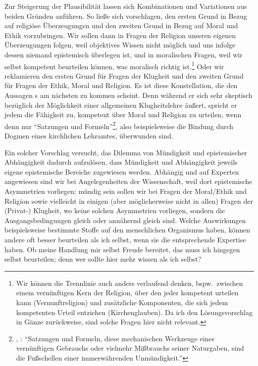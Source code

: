Zur Steigerung der Plausibilität lassen sich Kombinationen und Variationen aus
beiden Gründen anführen. So ließe sich vorschlagen, den ersten Grund in Bezug
auf religiöse Überzeugungen und den zweiten Grund in Bezug auf Moral und Ethik
vorzubringen. Wir sollen dann in Fragen der Religion unseren eigenen
Überzeugungen folgen, weil objektives Wissen nicht möglich und uns infolge
dessen niemand epistemisch überlegen ist, und in moralischen Fragen, weil wir
selbst kompetent beurteilen können, was moralisch richtig ist.\footnote{Wir
können die Trennlinie auch anders verlaufend denken, bspw.~zwischen einem
vernünftigen Kern der Religion, über den jeder kompetent urteilen kann
(Vernunftreligion) und zusätzliche Komponenten, die sich jedem kompetenten
Urteil entziehen (Kirchenglauben). Da ich den Lösungsvorschlag in Gänze
zurückweise, sind solche Fragen hier nicht relevant.} Oder wir reklamieren den
ersten Grund für Fragen der Klugheit und den zweiten Grund für Fragen der Ethik,
Moral und Religion. Es ist diese Konstellation, die den Aussagen s am
nächsten zu kommen scheint. Denn während er sich sehr skeptisch bezüglich der
Möglichkeit einer allgemeinen Klugheitslehre äußert, spricht er jedem die
Fähigkeit zu, kompetent über Moral und Religion zu urteilen, wenn denn nur
\enquote{Satzungen und
Formeln}\footnote{\cite[][A~483]{Kant:BeantwortungderFrage:WasistAufklaerung?1977},
\cite[][VIII: 36.8--10]{Kant:GesammelteWerke1900ff.}: \enquote{Satzungen und
Formeln, diese mechanischen Werkzeuge eines vernünftigen Gebrauchs oder vielmehr Mißbrauchs
seiner Naturgaben, sind die Fußschellen einer immerwährenden Unmündigkeit.}},
also beispielsweise die Bindung durch Dogmen eines kirchlichen Lehramtes, überwunden sind.

Ein solcher Vorschlag versucht, das Dilemma von Mündigkeit und epistemischer
Abhängigkeit dadurch aufzulösen, dass Mündigkeit und Abhängigkeit jeweils eigene
epistemische Bereiche zugewiesen werden. Abhängig und auf Experten angewiesen
sind wir bei Angelegenheiten der Wissenschaft, weil dort epistemische
Asymmetrien vorliegen; mündig sein sollen wir bei Fragen der Moral/Ethik und
Religion sowie vielleicht in einigen (aber möglicherweise nicht in allen)
Fragen der (Privat\mbox{-)} Klugheit, wo keine solchen Asymmetrien vorliegen,
sondern die Ausgangsbedingungen gleich oder annähernd gleich sind. Welche Auswirkungen beispielsweise bestimmte Stoffe auf den
menschlichen Organismus haben, können andere oft besser beurteilen als ich
selbst, wenn sie die entsprechende Expertise haben. Ob meine Handlung mir
selbst Freude bereitet, das muss ich hingegen selbst beurteilen; denn wer sollte
hier mehr wissen als ich selbst?


